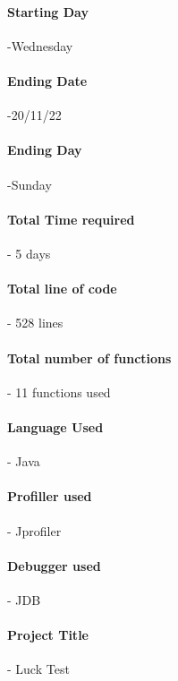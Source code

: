 \documentclass[]{article}
\begin{document}
\paragraph{Starting Day}-Wednesday
\\

\paragraph{Ending Date}-20/11/22
\\

\paragraph{Ending Day}-Sunday
\\

\paragraph{Total Time required}- 5 days
\\

\paragraph{Total line of code}- 528 lines 
\\

\paragraph{Total number of functions}- 11 functions used
\\
\paragraph{Language Used}- Java
\\
\paragraph{Profiller used}- Jprofiler
\\
\paragraph{Debugger used}- JDB
\\
\paragraph{Project Title}- Luck Test
\\


  
\end{document}
